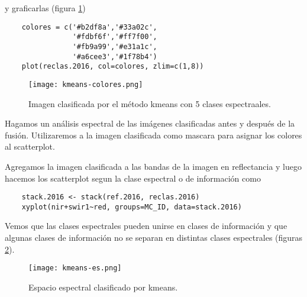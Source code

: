 \begin{exa}
  y graficarlas (figura \ref{fig:kmean5})

  \begin{lstlisting}
    colores = c('#b2df8a','#33a02c',
                '#fdbf6f','#ff7f00',
                '#fb9a99','#e31a1c',
                '#a6cee3','#1f78b4')
    plot(reclas.2016, col=colores, zlim=c(1,8))
  \end{lstlisting}
  \begin{figure}[h!]
    \centering
    \texttt{[image: kmeans-colores.png]}
    \caption{Imagen clasificada por el m\'etodo kmeans con 5 clases espectraales.}
    \label{fig:kmean5}
  \end{figure}
\end{exa}

\begin{exa}
  Hagamos un an\'alisis espectral de las im\'agenes clasificadas antes y despu\'es de la fusi\'on.  Utilizaremos a la imagen clasificada como mascara para asignar los colores  al scatterplot.

  Agregamos la imagen clasificada a las bandas de la imagen en reflectancia y luego hacemos los scatterplot segun la clase espectral o de informaci\'on como

  \begin{lstlisting}
    stack.2016 <- stack(ref.2016, reclas.2016)
    xyplot(nir+swir1~red, groups=MC_ID, data=stack.2016)
  \end{lstlisting}

  Vemos que las clases espectrales pueden unirse en clases de informaci\'on y que algunas clases de informaci\'on no se separan en distintas clases espectrales (figuras \ref{fig:esk}).

  \begin{figure}[h!]
    \centering
    \texttt{[image: kmeans-es.png]}
    \caption{Espacio espectral clasificado por kmeans.}
    \label{fig:esk}
  \end{figure}

\end{exa}

